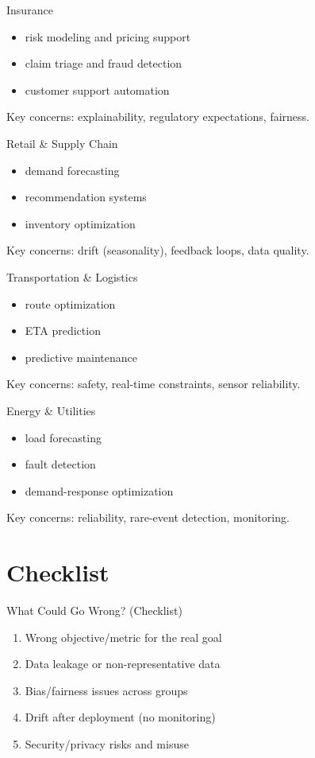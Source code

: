 \documentclass[aspectratio=169]{beamer}
\begin{document}
\begin{frame}{Insurance}
  \begin{itemize}[<+->]
    \item risk modeling and pricing support
    \item claim triage and fraud detection
    \item customer support automation
  \end{itemize}
  Key concerns: explainability, regulatory expectations, fairness.
\end{frame}

\begin{frame}{Retail \& Supply Chain}
  \begin{itemize}[<+->]
    \item demand forecasting
    \item recommendation systems
    \item inventory optimization
  \end{itemize}
  Key concerns: drift (seasonality), feedback loops, data quality.
\end{frame}

\begin{frame}{Transportation \& Logistics}
  \begin{itemize}[<+->]
    \item route optimization
    \item ETA prediction
    \item predictive maintenance
  \end{itemize}
  Key concerns: safety, real-time constraints, sensor reliability.
\end{frame}

\begin{frame}{Energy \& Utilities}
  \begin{itemize}[<+->]
    \item load forecasting
    \item fault detection
    \item demand-response optimization
  \end{itemize}
  Key concerns: reliability, rare-event detection, monitoring.
\end{frame}

\section{Checklist}
\label{sec:check}

\begin{frame}{What Could Go Wrong? (Checklist)}
  \begin{enumerate}[<+->]
    \item Wrong objective/metric for the real goal
    \item Data leakage or non-representative data
    \item Bias/fairness issues across groups
    \item Drift after deployment (no monitoring)
    \item Security/privacy risks and misuse
  \end{enumerate}
\end{frame}
\end{document}
